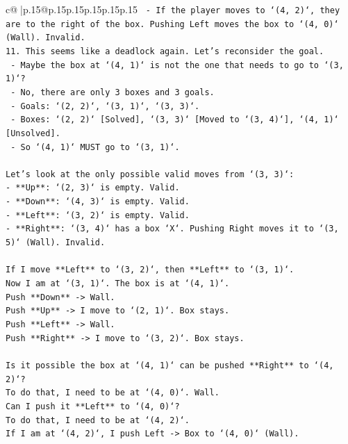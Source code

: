 \documentclass{article}
\begin{document}
{\begin{supertabular}{c@{$\;$}|p{.15\linewidth}@{}p{.15\linewidth}p{.15\linewidth}p{.15\linewidth}p{.15\linewidth}p{.15\linewidth}}
{{{\texttt{    {-} If the player moves to `(4, 2)`, they are to the right of the box. Pushing Left moves the box to `(4, 0)` (Wall). Invalid.} \\
\texttt{11. This seems like a deadlock again. Let's reconsider the goal.} \\
\texttt{    {-} Maybe the box at `(4, 1)` is not the one that needs to go to `(3, 1)`?} \\
\texttt{    {-} No, there are only 3 boxes and 3 goals.} \\
\texttt{    {-} Goals: `(2, 2)`, `(3, 1)`, `(3, 3)`.} \\
\texttt{    {-} Boxes: `(2, 2)` {[}Solved{]}, `(3, 3)` {[}Moved to `(3, 4)`{]}, `(4, 1)` {[}Unsolved{]}.} \\
\texttt{    {-} So `(4, 1)` MUST go to `(3, 1)`.} \\
\\ 
\texttt{Let's look at the only possible valid moves from `(3, 3)`:} \\
\texttt{{-} **Up**: `(2, 3)` is empty. Valid.} \\
\texttt{{-} **Down**: `(4, 3)` is empty. Valid.} \\
\texttt{{-} **Left**: `(3, 2)` is empty. Valid.} \\
\texttt{{-} **Right**: `(3, 4)` has a box `X`. Pushing Right moves it to `(3, 5)` (Wall). Invalid.} \\
\\ 
\texttt{If I move **Left** to `(3, 2)`, then **Left** to `(3, 1)`.} \\
\texttt{Now I am at `(3, 1)`. The box is at `(4, 1)`.} \\
\texttt{Push **Down** {-}> Wall.} \\
\texttt{Push **Up** {-}> I move to `(2, 1)`. Box stays.} \\
\texttt{Push **Left** {-}> Wall.} \\
\texttt{Push **Right** {-}> I move to `(3, 2)`. Box stays.} \\
\\ 
\texttt{Is it possible the box at `(4, 1)` can be pushed **Right** to `(4, 2)`?} \\
\texttt{To do that, I need to be at `(4, 0)`. Wall.} \\
\texttt{Can I push it **Left** to `(4, 0)`?} \\
\texttt{To do that, I need to be at `(4, 2)`.} \\
\texttt{If I am at `(4, 2)`, I push Left {-}> Box to `(4, 0)` (Wall).} \\
}}}
\end{supertabular}}
\end{document}
